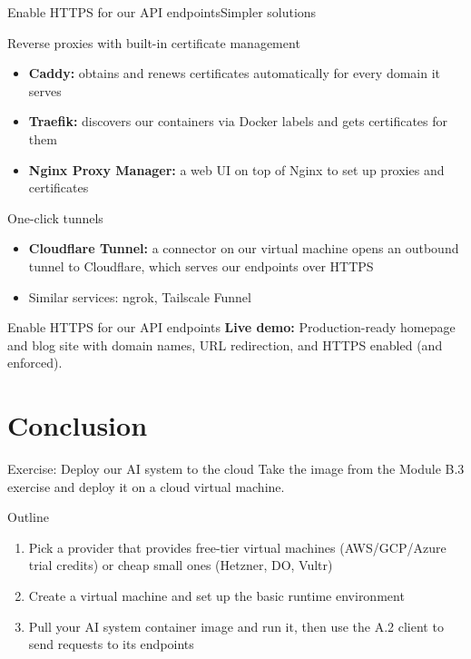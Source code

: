 \documentclass[aspectratio=169]{beamer}
\def\live#1{{\color{aaublue}\textbf{Live demo:}} #1}
\begin{document}
\begin{frame}{Enable HTTPS for our API endpoints}{Simpler solutions}
  \begin{block}{Reverse proxies with built-in certificate management}
    \begin{itemize}
      \item \textbf{Caddy:} obtains and renews certificates automatically for every domain it serves
      \item \textbf{Traefik:} discovers our containers via Docker labels and gets certificates for them
      \item \textbf{Nginx Proxy Manager:} a web UI on top of Nginx to set up proxies and certificates
    \end{itemize}
  \end{block}

  \begin{block}{One-click tunnels}
    \begin{itemize}
      \item \textbf{Cloudflare Tunnel:} a connector on our virtual machine opens an outbound tunnel to Cloudflare, which serves our endpoints over HTTPS
      \item Similar services: ngrok, Tailscale Funnel
    \end{itemize}
  \end{block}
\note{
}
\end{frame}


\begin{frame}{Enable HTTPS for our API endpoints}
  \live{Production-ready homepage and blog site with domain names, URL redirection, and HTTPS enabled (and enforced).}
\note{
}
\end{frame}



\section{Conclusion}

\begin{frame}{Exercise: Deploy our AI system to the cloud}
    Take the image from the Module B.3 exercise and deploy it on a cloud virtual machine.

    \begin{block}{Outline}
        \begin{enumerate}
            \item Pick a provider that provides free-tier virtual machines (AWS/GCP/Azure trial credits) or cheap small ones (Hetzner, DO, Vultr)
            \item Create a virtual machine and set up the basic runtime environment
            \item Pull your AI system container image and run it, then use the A.2 client to send requests to its endpoints
        \end{enumerate}
    \end{block}
\note{
}
\end{frame}
\end{document}
